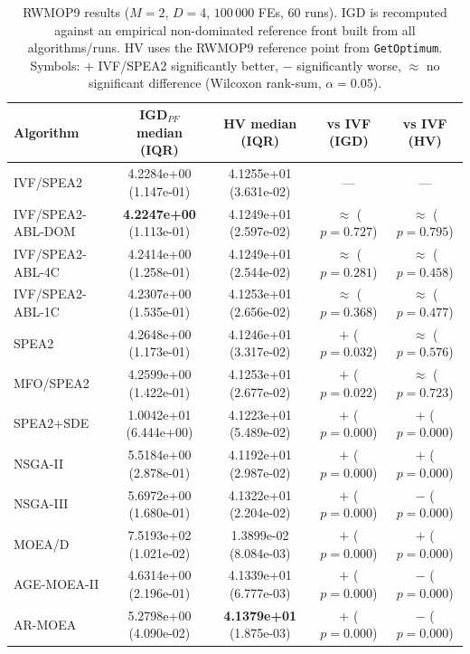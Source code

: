 \begin{table}[t]
\centering
\caption{RWMOP9 results ($M=2$, $D=4$, $100\,000$ FEs, 60 runs). IGD is recomputed against an empirical non-dominated reference front built from all algorithms/runs. HV uses the RWMOP9 reference point from \texttt{GetOptimum}. Symbols: $+$ IVF/SPEA2 significantly better, $-$ significantly worse, $\approx$ no significant difference (Wilcoxon rank-sum, $\alpha=0.05$).}
\label{tab:rwmop9}
\scriptsize
\begin{tabular}{lcccc}
\toprule
Algorithm & IGD$_{PF}$ median (IQR) & HV median (IQR) & vs IVF (IGD) & vs IVF (HV) \\
\midrule
IVF/SPEA2 & 4.2284e+00 (1.147e-01) & 4.1255e+01 (3.631e-02) & --- & --- \\
IVF/SPEA2-ABL-DOM & \textbf{4.2247e+00} (1.113e-01) & 4.1249e+01 (2.597e-02) & $≈$ ($p=0.727$) & $≈$ ($p=0.795$) \\
IVF/SPEA2-ABL-4C & 4.2414e+00 (1.258e-01) & 4.1249e+01 (2.544e-02) & $≈$ ($p=0.281$) & $≈$ ($p=0.458$) \\
IVF/SPEA2-ABL-1C & 4.2307e+00 (1.535e-01) & 4.1253e+01 (2.656e-02) & $≈$ ($p=0.368$) & $≈$ ($p=0.477$) \\
SPEA2 & 4.2648e+00 (1.173e-01) & 4.1246e+01 (3.317e-02) & $+$ ($p=0.032$) & $≈$ ($p=0.576$) \\
MFO/SPEA2 & 4.2599e+00 (1.422e-01) & 4.1253e+01 (2.677e-02) & $+$ ($p=0.022$) & $≈$ ($p=0.723$) \\
SPEA2+SDE & 1.0042e+01 (6.444e+00) & 4.1223e+01 (5.489e-02) & $+$ ($p=0.000$) & $+$ ($p=0.000$) \\
NSGA-II & 5.5184e+00 (2.878e-01) & 4.1192e+01 (2.987e-02) & $+$ ($p=0.000$) & $+$ ($p=0.000$) \\
NSGA-III & 5.6972e+00 (1.680e-01) & 4.1322e+01 (2.204e-02) & $+$ ($p=0.000$) & $-$ ($p=0.000$) \\
MOEA/D & 7.5193e+02 (1.021e-02) & 1.3899e-02 (8.084e-03) & $+$ ($p=0.000$) & $+$ ($p=0.000$) \\
AGE-MOEA-II & 4.6314e+00 (2.196e-01) & 4.1339e+01 (6.777e-03) & $+$ ($p=0.000$) & $-$ ($p=0.000$) \\
AR-MOEA & 5.2798e+00 (4.090e-02) & \textbf{4.1379e+01} (1.875e-03) & $+$ ($p=0.000$) & $-$ ($p=0.000$) \\
\bottomrule
\end{tabular}
\end{table}
